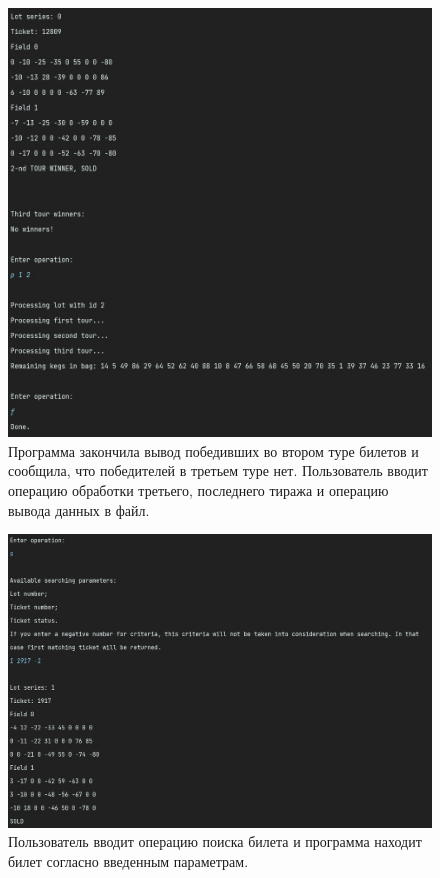\documentclass[a4paper,14pt]{article}
\begin{document}
\begin{figure}
  \centering
  \captionsetup{justification=centering,margin=1cm}
  \includegraphics[width=\linewidth]{pictures/5}
  \caption{Программа закончила вывод победивших во втором туре билетов и сообщила, что победителей в третьем туре нет. Пользователь вводит операцию обработки третьего, последнего тиража и операцию вывода данных в файл.}
\end{figure}
\begin{figure}[H]
  \centering
  \captionsetup{justification=centering,margin=1cm}
  \includegraphics[width=\linewidth]{pictures/10}
  \caption{Пользователь вводит операцию поиска билета и программа находит билет согласно введенным параметрам.}
\end{figure}
\end{document}
